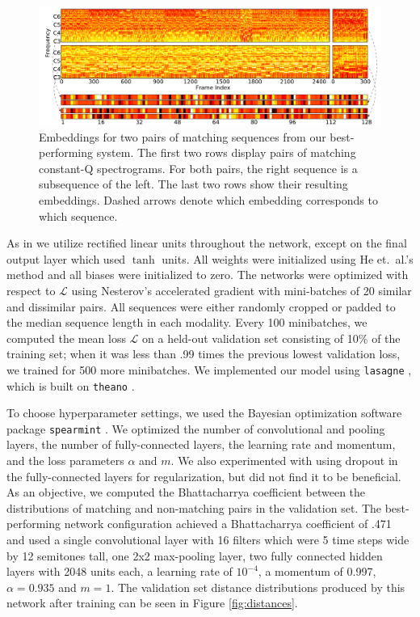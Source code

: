 \documentclass{article}
\begin{document}
\begin{figure}[htb!]
  \centering
  \includegraphics[width=\textwidth]{embeddings.pdf}
  \caption{Embeddings for two pairs of matching sequences from our best-performing system.  The first two rows display pairs of matching constant-Q spectrograms.  For both pairs, the right sequence is a subsequence of the left.  The last two rows show their resulting embeddings.  Dashed arrows denote which embedding corresponds to which sequence.}
  \label{fig:embeddings}
\end{figure}

As in \cite{raffel2015large} we utilize rectified linear units throughout the network, except on the final output layer which used $\tanh$ units.
All weights were initialized using He et.\ al.'s method \cite{he2015delving} and all biases were initialized to zero.
The networks were optimized with respect to $\mathcal{L}$ using Nesterov's accelerated gradient \cite{sutskever2013importance} with mini-batches of 20 similar and dissimilar pairs.
All sequences were either randomly cropped or padded to the median sequence length in each modality.
Every 100 minibatches, we computed the mean loss $\mathcal{L}$ on a held-out validation set consisting of 10\% of the training set; when it was less than .99 times the previous lowest validation loss, we trained for 500 more minibatches.
We implemented our model using \texttt{lasagne} \cite{dieleman2015lasagne}, which is built on \texttt{theano} \cite{bergstra2010theano, bastien2012theano}.

To choose hyperparameter settings, we used the Bayesian optimization software package \texttt{spearmint} \cite{snoek2012practical}.
We optimized the number of convolutional and pooling layers, the number of fully-connected layers, the learning rate and momentum, and the loss parameters $\alpha$ and $m$.
We also experimented with using dropout \cite{hinton2012improving} in the fully-connected layers for regularization, but did not find it to be beneficial.
As an objective, we computed the Bhattacharrya coefficient \cite{bhattacharyya1943measure} between the distributions of matching and non-matching pairs in the validation set.
The best-performing network configuration achieved a Bhattacharrya coefficient of .471 and used a single convolutional layer with 16 filters which were 5 time steps wide by 12 semitones tall, one 2x2 max-pooling layer, two fully connected hidden layers with 2048 units each, a learning rate of $10^{-4}$, a momentum of 0.997, $\alpha = 0.935$ and $m = 1$.
The validation set distance distributions produced by this network after training can be seen in Figure \ref{fig:distances}.
\end{document}
